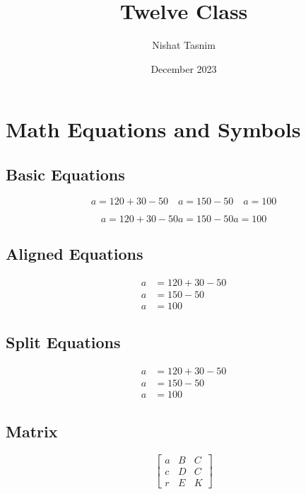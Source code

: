 \documentclass{article}
\title{Twelve Class}
\author{Nishat Tasnim}
\date{December 2023}
\begin{document}
\section{Math Equations and Symbols}

\subsection{Basic Equations}

\begin{equation}
    a = 120 + 30 - 50 \quad a = 150 - 50 \quad a = 100
\end{equation}

\begin{equation}
    a = 120+30-50
    a = 150-50
    a = 100
\end{equation}

\subsection{Aligned Equations}

\begin{align*}
    a & = 120 + 30 - 50 \\
    a & = 150 - 50 \\
    a & = 100
\end{align*}

\subsection{Split Equations}

\begin{equation}
    \begin{split}
        a & = 120 + 30 - 50 \\
        a & = 150 - 50 \\
        a & = 100
    \end{split}
\end{equation}

\subsection{Matrix}

\begin{equation}
    \begin{bmatrix}
        a & B & C \\
        c & D & C \\
        r & E & K
    \end{bmatrix}
\end{equation}
\end{document}

